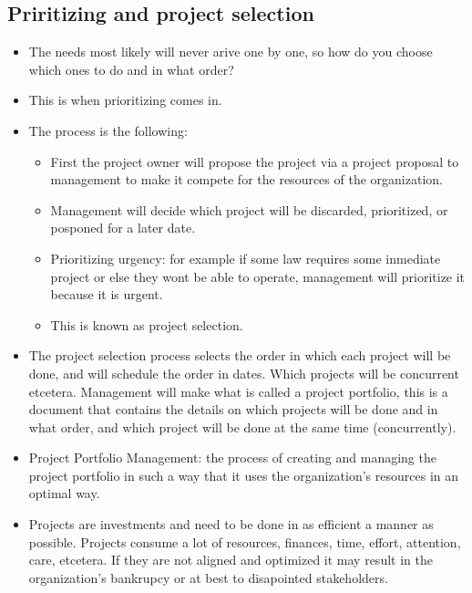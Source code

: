 \subsection{Priritizing and project selection}
\begin{itemize}
    \item The needs most likely will never arive one by one, so how do you choose which ones to do and in what order?
    \item This is when prioritizing comes in.
    \item The process is the following:
        \begin{itemize}
            \item First the project owner will propose the project via a project proposal to management to make it compete for the resources of the organization.
            \item Management will decide which project will be discarded, prioritized, or posponed for a later date.
            \item Prioritizing urgency: for example if some law requires some inmediate project or else they wont be able to operate, management will prioritize it because it is urgent.
            \item This is known as project selection.
        \end{itemize}
    
    \item The project selection process selects the order in which each project will be done, and will schedule the order in dates. Which projects will be concurrent etcetera. Management will make what is called a project portfolio, this is a document that contains the details on which projects will be done and in what order, and which project will be done at the same time (concurrently).
    \item Project Portfolio Management: the process of creating and managing the project portfolio in such a way that it uses the organization's resources in an optimal way.
    \item Projects are investments and need to be done in as efficient a manner as possible. Projects consume a lot of resources, finances, time, effort, attention, care, etcetera. If they are not aligned and optimized it may result in the organization's bankrupcy or at best to disapointed stakeholders.
\end{itemize}

